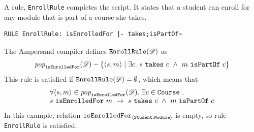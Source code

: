 \documentclass[runningheads]{llncs}
\newcommand{\id}[1]{\text{\it #1\/}}
\newcommand{\popF}[1]{\id{pop}_{#1}}
\newcommand{\pop}[2]{\popF{#1}(#2)}
\newcommand{\viol}[2]{{#1}(#2)}
\newcommand{\declare}[3]{\id{#1}_{\pair{#2}{#3}}}
\newcommand{\pair}[2]{\langle{#1},{#2}\rangle}
\newcommand{\dataset}{\mathscr{D}}
\begin{document}
   A rule, {\tt EnrollRule} completes the script.
   It states that a student can enroll for any module that is part of a course she takes.
\begin{verbatim}
RULE EnrollRule: isEnrolledFor |- takes;isPartOf~
\end{verbatim}
   The Ampersand compiler defines $\viol{\tt EnrollRule}{\dataset}$ as
\begin{equation}
   \pop{\tt isEnrolledFor}{\dataset}-\{\pair{s}{m} \mid\exists c.~s\ \text{\tt takes}\ c\ \wedge\ m\ \text{\tt isPartOf}\ c\}
\end{equation}
   This rule is satisfied if $\viol{\tt EnrollRule}{\dataset}=\emptyset$, which means that
\begin{equation}
   \begin{array}{l}
   \forall \pair{s}{m}\in\pop{\tt isEnrolledFor}{\dataset}.~ \exists c\in\text{\tt Course}~.\\
   s\ \text{\tt isEnrolledFor}\ m\ \rightarrow\ s\ \text{\tt takes}\ c\ \wedge\ m\ \text{\tt isPartOf}\ c
   \end{array}
\label{eqn:example isEnrolledFor}
\end{equation}
   In this example, relation $\declare{\tt isEnrolledFor}{\tt Student}{\tt Module}$ is empty, so rule {\tt EnrollRule} is satisfied.
\end{document}
